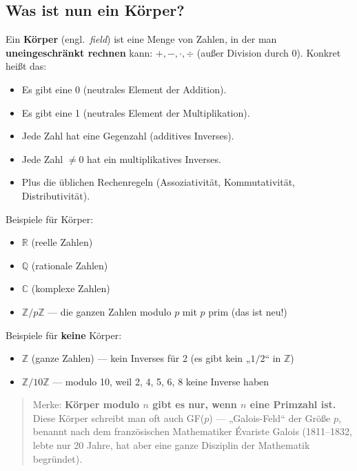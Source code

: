 \subsection*{Was ist nun ein Körper?}

Ein \textbf{Körper} (engl.\ \emph{field}) ist eine Menge von Zahlen,
in der man \textbf{uneingeschränkt rechnen} kann: $+, -, \cdot, \div$
(außer Division durch 0). Konkret heißt das:

\begin{itemize}
\item Es gibt eine 0 (neutrales Element der Addition).
\item Es gibt eine 1 (neutrales Element der Multiplikation).
\item Jede Zahl hat eine Gegenzahl (additives Inverses).
\item Jede Zahl $\ne 0$ hat ein multiplikatives Inverses.
\item Plus die üblichen Rechenregeln (Assoziativität, Kommutativität,
  Distributivität).
\end{itemize}

Beispiele für Körper:
\begin{itemize}
\item $\mathbb{R}$ (reelle Zahlen)
\item $\mathbb{Q}$ (rationale Zahlen)
\item $\mathbb{C}$ (komplexe Zahlen)
\item $\mathbb{Z}/p\mathbb{Z}$ — die ganzen Zahlen modulo $p$ mit $p$
  prim (das ist neu!)
\end{itemize}

Beispiele für \textbf{keine} Körper:
\begin{itemize}
\item $\mathbb{Z}$ (ganze Zahlen) — kein Inverses für 2 (es gibt kein
  „$1/2$“ in $\mathbb{Z}$)
\item $\mathbb{Z}/10\mathbb{Z}$ — modulo 10, weil 2, 4, 5, 6, 8 keine
  Inverse haben
\end{itemize}

\begin{quote}
Merke: \textbf{Körper modulo $n$ gibt es nur, wenn $n$ eine Primzahl
ist.} Diese Körper schreibt man oft auch GF($p$) — „Galois-Feld“ der
Größe $p$, benannt nach dem französischen Mathematiker Évariste Galois
(1811–1832, lebte nur 20 Jahre, hat aber eine ganze Disziplin der
Mathematik begründet).
\end{quote}

